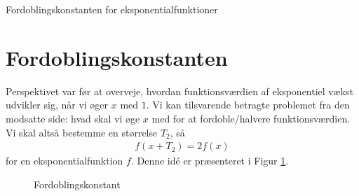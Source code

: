 \documentclass[12pt]{article}
\begin{document}






\begin{center}
\Huge
Fordoblingskonstanten for eksponentialfunktioner
\end{center}
\section*{Fordoblingskonstanten}
Perspektivet var før at overveje, hvordan funktionsværdien af eksponentiel vækst udvikler sig, når vi øger $x$ med $1$. Vi kan tilsvarende betragte problemet fra den modsatte side: hvad skal vi øge $x$ med for at fordoble/halvere funktionsværdien. Vi skal altså bestemme en størrelse $T_2$, så 
\begin{align*}
f(x+T_2) = 2f(x)
\end{align*}
for en eksponentialfunktion $f$. Denne idé er præsenteret i Figur \ref{fig:Fordobling}. 
\begin{figure}[H]
\center
{}

\caption{Fordoblingskonstant}
\label{fig:Fordobling}
\end{figure}
\end{document}
